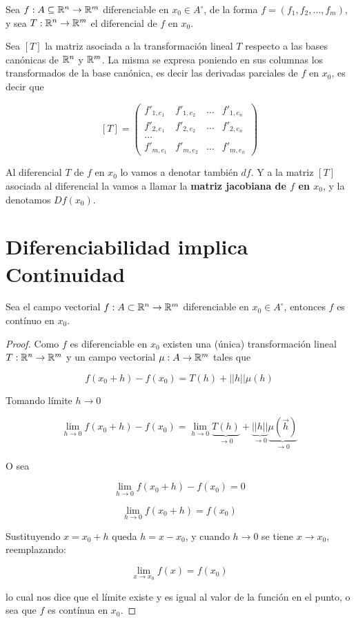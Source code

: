 \begin{definition}[Jacobiana]
Sea $f : A \subseteq \mathbb{R}^n \to \mathbb{R}^m$  diferenciable en $x_0 \in A^{\circ}$, de la forma $ f = (f_1, f_2, \ldots, f_m)$, y sea $T : \mathbb{R}^n \to \mathbb{R}^m$ el diferencial de $f$ en $x_0$.

Sea $[T]$ la matriz asociada a la transformación lineal $T$ respecto a las bases canónicas de $\mathbb{R}^n$ y $\mathbb{R}^m$.  La misma se expresa poniendo en sus columnas los transformados de la base canónica, es decir las derivadas parciales de $f$ en $x_0$, es decir que

$$ [T] = \begin{pmatrix} f'_{1, e_1} & f'_{1, e_2} & \ldots & f'_{1, e_n} \\ f'_{2, e_1} & f'_{2, e_2} & \ldots & f'_{2, e_n} \\ \ldots \\ f'_{m, e_1} & f'_{m, e_2} & \ldots & f'_{m, e_n} \end{pmatrix} $$

Al diferencial $T$ de $f$ en $x_0$ lo vamos a denotar también $df$.  Y a la matriz $[T]$ asociada al diferencial la vamos a llamar la \textbf{matriz jacobiana de $f$ en $x_0$},  y la denotamos $Df(x_0)$.
\end{definition}

\section{Diferenciabilidad implica Continuidad}

\begin{theorem}
Sea el campo vectorial $ f : A \subset \mathbb{R}^n \to \mathbb{R}^m$ diferenciable en $ x_0 \in A^{\circ}$, entonces $f$ es contínuo en $x_0$.
\end{theorem}

\begin{proof}
Como $ f$ es diferenciable en $x_0$ existen una (única) transformación lineal $ T : \mathbb{R}^n \to \mathbb{R}^m$ y un campo vectorial $ \mu : A \to \mathbb{R}^m$ tales que

$$ f(x_0 + h) - f(x_0) = T(h) + ||h|| \mu(h) $$

Tomando límite $h \to 0$

$$ \lim_{h \to 0} f(x_0 + h) - f(x_0) = \lim_{h \to 0} \underbrace{T(h)}_{\to 0} + \underbrace{||h||}_{\to 0} \underbrace{\mu(\vec{h})}_{\to 0}$$

O sea

$$ \lim_{h \to 0} f(x_0 + h) - f(x_0) = 0 $$

$$ \lim_{h \to 0} f(x_0 + h) = f(x_0) $$

Sustituyendo $ x = x_0 + h$ queda $ h = x - x_0$, y cuando $ h \to 0$ se tiene $x \to x_0$, reemplazando:

$$ \lim_{x \to x_0} f(x) = f(x_0) $$

lo cual nos dice que el límite existe y es igual al valor de la función en el punto, o sea que $f$ es contínua en $x_0$.
\end{proof}

